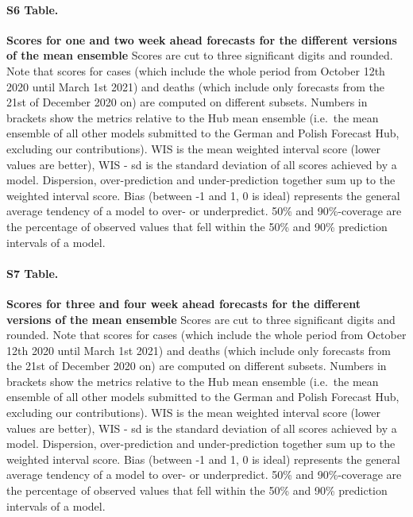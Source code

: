 \documentclass[10pt,letterpaper]{article}
\begin{document}
\paragraph{S6 Table.}
\label{tab:score-table-ensemble-mean-2}

\textbf{Scores for one and two week ahead forecasts for the different versions of the mean ensemble}
Scores are cut to three significant digits and rounded. Note that scores
for cases (which include the whole period from October 12th 2020 until
March 1st 2021) and deaths (which include only forecasts from the 21st
of December 2020 on) are computed on different subsets. Numbers in
brackets show the metrics relative to the Hub mean ensemble (i.e.~the
mean ensemble of all other models submitted to the German and Polish
Forecast Hub, excluding our contributions). WIS is the mean weighted
interval score (lower values are better), WIS - sd is the standard
deviation of all scores achieved by a model. Dispersion, over-prediction
and under-prediction together sum up to the weighted interval score.
Bias (between -1 and 1, 0 is ideal) represents the general average
tendency of a model to over- or underpredict. 50\% and 90\%-coverage are
the percentage of observed values that fell within the 50\% and 90\%
prediction intervals of a model.

\paragraph{S7 Table.}
\label{tab:score-table-ensemble-mean-4}

\textbf{Scores for three and four week ahead forecasts for the different versions of the mean ensemble}
Scores are cut to three significant digits and rounded. Note that scores
for cases (which include the whole period from October 12th 2020 until
March 1st 2021) and deaths (which include only forecasts from the 21st
of December 2020 on) are computed on different subsets. Numbers in
brackets show the metrics relative to the Hub mean ensemble (i.e.~the
mean ensemble of all other models submitted to the German and Polish
Forecast Hub, excluding our contributions). WIS is the mean weighted
interval score (lower values are better), WIS - sd is the standard
deviation of all scores achieved by a model. Dispersion, over-prediction
and under-prediction together sum up to the weighted interval score.
Bias (between -1 and 1, 0 is ideal) represents the general average
tendency of a model to over- or underpredict. 50\% and 90\%-coverage are
the percentage of observed values that fell within the 50\% and 90\%
prediction intervals of a model.
\end{document}
